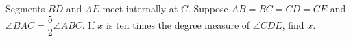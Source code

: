 Segments $BD$ and $AE$ meet internally at $C$. Suppose $AB=BC=CD=CE$ and $\angle BAC=\dfrac{5}{2}\angle ABC$. If $x$ is ten times the degree measure of $\angle CDE$, find $x$.
